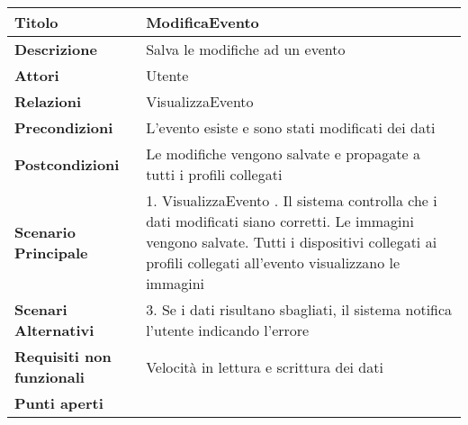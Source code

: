 \begin{tabular} {|P{4.5cm}|P{11cm}|}
  \hline
  \textbf{Titolo}                   & ModificaEvento                                                                    \\
  \hline
  \textbf{Descrizione}              & Salva le modifiche ad un evento                                                   \\
  \hline
  \textbf{Attori}                   & Utente                                                                            \\
  \hline
  \textbf{Relazioni}                & VisualizzaEvento                                                                  \\
  \hline
  \textbf{Precondizioni}            & L'evento esiste e sono stati modificati dei dati                                  \\
  \hline
  \textbf{Postcondizioni}           & Le modifiche vengono salvate e propagate a tutti i profili collegati              \\
  \hline
  \textbf{Scenario Principale}      & 1. VisualizzaEvento . Il sistema controlla che i dati modificati siano corretti. Le immagini vengono salvate. Tutti i dispositivi collegati ai profili collegati all'evento visualizzano le immagini                             \\
  \hline
  \textbf{Scenari Alternativi}      & 3. Se i dati risultano sbagliati, il sistema notifica l'utente indicando l'errore \\
  \hline
  \textbf{Requisiti non funzionali} & Velocità in lettura e scrittura dei dati                                          \\
  \hline
  \textbf{Punti aperti}             &                                                                                   \\
  \hline
\end{tabular}
\hfill
\break


